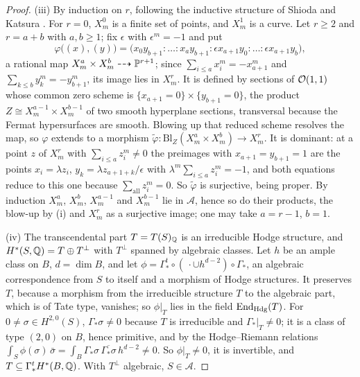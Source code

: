 \begin{proof}
(iii) By induction on $r$, following the inductive structure of Shioda and
Katsura \cite{SK79}. For $r=0$, $X^{0}_{m}$ is a finite set of points, and
$X^{1}_{m}$ is a curve. Let $r\ge2$ and $r=a+b$ with $a,b\ge1$; fix
$\epsilon$ with $\epsilon^{m}=-1$ and put
\[
  \varphi\bigl((x),(y)\bigr)=\bigl(x_{0}y_{b+1}:\dots:x_{a}y_{b+1}:
  \epsilon x_{a+1}y_{0}:\dots:\epsilon x_{a+1}y_{b}\bigr),
\]
a rational map $X^{a}_{m}\times X^{b}_{m}\dashrightarrow\mathbb{P}^{r+1}$; since
$\sum_{i\le a}x_{i}^{m}=-x_{a+1}^{m}$ and $\sum_{k\le b}y_{k}^{m}=-y_{b+1}^{m}$,
its image lies in $X^{r}_{m}$. It is defined by sections of
$\mathcal{O}(1,1)$ whose common zero scheme is $\{x_{a+1}=0\}\times\{y_{b+1}=0\}$,
the product $Z\cong X^{a-1}_{m}\times X^{b-1}_{m}$ of two smooth
hyperplane sections, transversal because the Fermat hypersurfaces
are smooth. Blowing up that reduced scheme resolves the map, so $\varphi$
extends to a morphism $\widetilde\varphi\colon\mathrm{Bl}_{Z}(X^{a}_{m}\times
X^{b}_{m})\to X^{r}_{m}$. It is dominant: at a point $z$ of $X^{r}_{m}$ with
$\sum_{i\le a}z_{i}^{m}\ne0$ the preimages with $x_{a+1}=y_{b+1}=1$ are the
points $x_{i}=\lambda z_{i}$, $y_{k}=\lambda z_{a+1+k}/\epsilon$ with
$\lambda^{m}\sum_{i\le a}z_{i}^{m}=-1$, and both equations reduce to this one
because $\sum_{\text{all}}z_{i}^{m}=0$. So $\widetilde\varphi$ is surjective,
being proper. By induction $X^{a}_{m}$, $X^{b}_{m}$, $X^{a-1}_{m}$ and
$X^{b-1}_{m}$ lie in $\mathcal{A}$, hence so do their products, the blow-up
by (i) and $X^{r}_{m}$ as a surjective image; one may take $a=r-1$, $b=1$.

(iv) The transcendental part $T=T(S)_{\mathbb{Q}}$ is an irreducible Hodge
structure, and $H^{*}(S,\mathbb{Q})=T\oplus T^{\perp}$ with $T^{\perp}$ spanned by
algebraic classes. Let $h$ be an ample class on $B$, $d=\dim B$, and let
$\phi=\Gamma^{t}_{*}\circ(\,\cdot\cup h^{d-2})\circ\Gamma_{*}$, an algebraic
correspondence from $S$ to itself and a morphism of Hodge structures. It
preserves $T$, because a morphism from the irreducible structure $T$ to the
algebraic part, which is of Tate type, vanishes; so $\phi|_{T}$ lies in the
field $\operatorname{End}_{\mathrm{Hdg}}(T)$. For $0\ne\sigma\in H^{2,0}(S)$,
$\Gamma_{*}\sigma\ne0$ because $T$ is irreducible and $\Gamma_{*}|_{T}\ne0$;
it is a class of type $(2,0)$ on $B$, hence primitive, and by the
Hodge--Riemann relations $\int_{S}\phi(\sigma)\,\bar\sigma=\int_{B}
\Gamma_{*}\sigma\,\overline{\Gamma_{*}\sigma}\,h^{d-2}\ne0$. So
$\phi|_{T}\ne0$, it is invertible, and $T\subseteq\Gamma^{t}_{*}H^{*}(B,\mathbb{Q})$.
With $T^{\perp}$ algebraic, $S\in\mathcal{A}$.


\end{proof}
